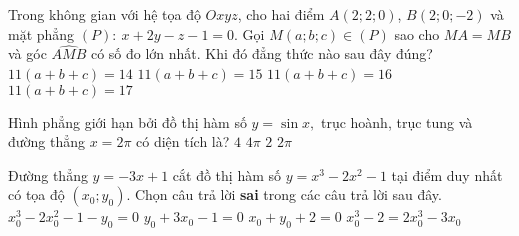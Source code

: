 \begin{ex}%
Trong không gian với hệ tọa độ $Oxyz$, cho hai điểm $A(2;2;0)$, $B(2;0;-2)$ và mặt phẳng $(P):\ x+2y-z-1=0$. Gọi $M(a;b;c) \in (P) $ sao cho $MA=MB$ và góc $\widehat{AMB}$ có số đo lớn nhất. Khi đó đẳng thức nào sau đây đúng?
\choice
{\True $11(a+b+c)=14$}
{$11(a+b+c)=15$}
{$11(a+b+c)=16$}
{$11(a+b+c)=17$}
\end{ex}
\begin{ex}%
Hình phẳng giới hạn bởi đồ thị hàm số $y=\sin x,$ trục hoành, trục tung và đường thẳng $x=2\pi$ có diện tích là?
\choice
{\True $4$}
{$4\pi$}
{$2$}
{$2\pi$}
\end{ex}
\begin{ex}%
Đường thẳng $y=-3x+1$ cắt đồ thị hàm số $y=x^3-2x^2-1$ tại điểm duy nhất có tọa độ $(x_0;y_0)$. Chọn câu trả lời \textbf{sai} trong các câu trả lời sau đây.
\choice
{$x_0^3-2x_0^2-1-y_0=0$}
{$y_0+3x_0-1=0$}
{\True $x_0+y_0+2=0$}
{$x_0^3-2=2x_0^3-3x_0$}
\end{ex}
